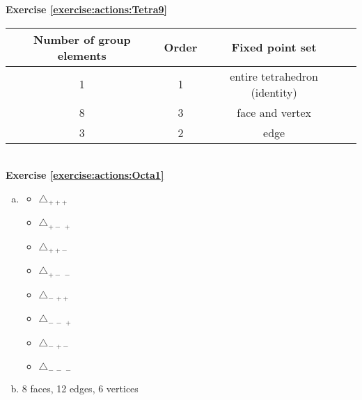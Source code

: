 \noindent\textbf{Exercise \ref{exercise:actions:Tetra9}}
%  
\\
\begin{tabular}{| c |c|c| r |} \hline
\textbf{ Number of group elements} & \textbf{Order} & \textbf{Fixed point set} \\ \hline
 1&  1& entire tetrahedron (identity) \\ \hline
8 & 3 & face and vertex \\ \hline
 3 & 2 & edge \\ \hline
\end{tabular}
 \\

\noindent\textbf{Exercise \ref{exercise:actions:Octa1}}
\begin{enumerate}[(a)]
\item
\begin{multicols}{4}
	\begin{itemize}
	\item
	$\triangle_{ +++}$
	
	\item
	$\triangle_{ +-\,+}$
	
	\item
	$\triangle_{ ++-\,}$
	
	\item
	$\triangle_{ +-\,-\,}$
	
	\item
	$\triangle_{-\,++}$
	
	\item
	$\triangle_{-\,-\,+}$
	
	\item
	$\triangle_{-\,+-\,}$
	
	\item
	$\triangle_{-\,-\,-\,}$
	\end{itemize}
	\end{multicols}
	
\item
8 faces, 12 edges, 6 vertices
\end{enumerate}

